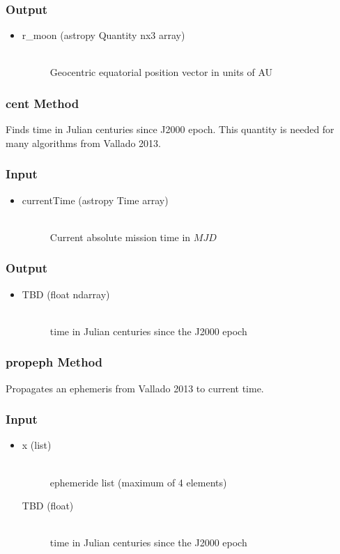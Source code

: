 \documentclass[cleanfoot]{asme2ej}
\begin{document}
\subsubsection*{Output}
\begin{itemize}
\item
\begin{description}
    \item[r\_moon (astropy Quantity nx3 array)] \hfill \\ Geocentric equatorial position vector in units of AU
\end{description}
\end{itemize}

\subsubsection{cent Method} 
Finds time in Julian centuries since J2000 epoch. This quantity is needed for many algorithms from Vallado 2013.
\subsubsection*{Input}
\begin{itemize}
\item
\begin{description}
    \item[currentTime (astropy Time array)] \hfill \\ Current absolute mission time in $MJD$
\end{description}
\end{itemize}
\subsubsection*{Output}
\begin{itemize}
\item
\begin{description}
    \item[TBD (float ndarray)] \hfill \\ time in Julian centuries since the J2000 epoch 
\end{description}
\end{itemize}

\subsubsection{propeph Method} 
Propagates an ephemeris from Vallado 2013 to current time.
\subsubsection*{Input}
\begin{itemize}
\item
\begin{description}
    \item[x (list)] \hfill \\ ephemeride list (maximum of 4 elements)
    \item[TBD (float)] \hfill \\ time in Julian centuries since the J2000 epoch 
\end{description}
\end{itemize}
\end{document}
